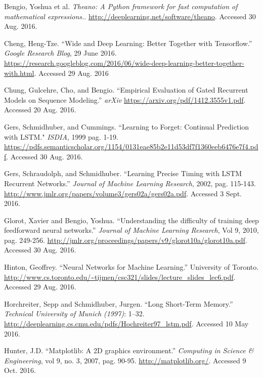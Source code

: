 \documentclass[12pt, titlepage]{article}
\begin{document}
\newpage
\begin{thebibliography}{9}
		Bengio, Yoshua et al. \textit{Theano: A Python framework for fast
		computation of mathematical expressions.}.
		\url{http://deeplearning.net/software/theano}. Accessed 30 Aug. 2016.

		Cheng, Heng-Tze. ``Wide and Deep Learning: Better Together with
		Tensorflow.'' \textit{Google Research Blog}, 29 June 2016.
		\url{https://research.googleblog.com/2016/06/wide-deep-learning-better-together-with.html}.
		Accessed 29 Aug. 2016

		Chung, Gulcehre, Cho, and Bengio. ``Empirical Evaluation of Gated
		Recurrent Models on Sequence Modeling.'' \textit{arXiv}
		\url{https://arxiv.org/pdf/1412.3555v1.pdf}. Accessed 20 Aug. 2016.

		Gers, Schmidhuber, and Cummings. ``Learning to Forget: Continual
		Prediction with LSTM." \textit{ISDIA}, 1999 pag. 1-19.
		\url{https://pdfs.semanticscholar.org/1154/0131eae85b2e11d53df7f1360eeb6476e7f4.pdf}.
		Accessed 30 Aug. 2016.

		Gers, Schraudolph, and Schmidhuber. ``Learning Precise Timing with LSTM
		Recurrent Networks.'' \textit{Journal of Machine Learning Research},
		2002, pag. 115-143.
		\url{http://www.jmlr.org/papers/volume3/gers02a/gers02a.pdf}. Accessed 3
		Sept. 2016.

		Glorot, Xavier and Bengio, Yoshua. ``Understanding the difficulty of
		training deep feedforward neural networks.'' \textit{Journal of Machine
		Learning Research}, Vol 9, 2010, pag. 249-256.
		\url{http://jmlr.org/proceedings/papers/v9/glorot10a/glorot10a.pdf}.
		Accessed 30 Aug. 2016.

		Hinton, Geoffrey. ``Neural Networks for Machine Learning.'' University
		of Toronto.
		\url{http://www.cs.toronto.edu/~tijmen/csc321/slides/lecture_slides_lec6.pdf}.
		Accessed 29 Aug. 2016.

		Horchreiter, Sepp and Schmidhuber, Jurgen. ``Long Short-Term Memory.''
		\textit{Technical University of Munich (1997)}: 1--32.
		\url{http://deeplearning.cs.cmu.edu/pdfs/Hochreiter97_lstm.pdf}.
		Accessed 10 May 2016.

		Hunter, J.D. ``Matplotlib: A 2D graphics environment.''
		\textit{Computing in Science \& Engineering}, vol 9, no. 3, 2007, pag.
		90-95. \url{http://matplotlib.org/}. Accessed 9 Oct.  2016.


\end{thebibliography}
\end{document}
